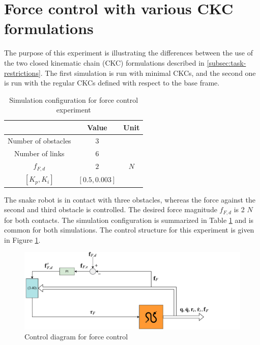 \section{Force control with various CKC formulations}\label{sec:2xminiJforce}

The purpose of this experiment is illustrating the differences between the use of the two closed kinematic chain (CKC) formulations described in \ref{subsec:task-restrictions}. The first simulation is run with minimal CKCs, and the second one is run with the regular CKCs defined with respect to the base frame.

\begin{table}[h!]
    \centering
    \begin{tabular}{|c|c|c|}
        \hline
        & \textbf{Value} & \textbf{Unit}\\
        \hline \hline
        Number of obstacles & $3$ & \\
        Number of links & $6$ & \\
        $f_{F,d}$ & $2$ & $N$ \\
        $[K_{p}, K_{i}]$ & $[0.5, 0.003]$ &\\
        \hline
    \end{tabular}
    \caption{Simulation configuration for force control experiment}
    \label{tab:exp_2xf}
\end{table}

The snake robot is in contact with three obstacles, whereas the force against the second and third obstacle is controlled. The desired force magnitude $f_{F,d}$ is 2 $N$ for both contacts. The simulation configuration is summarized in Table \ref{tab:exp_2xf} and is common for both simulations. The control structure for this experiment is given in Figure \ref{fig:diag-f}.



\begin{figure}[h!]
    \centering
    \includegraphics[trim=0cm 0cm 3cm 0cm, clip=true, width=\textwidth]{figures/experiments/control-diagrams/2f-control-diagram.pdf}
    \caption{Control diagram for force control}
    \label{fig:diag-f}
\end{figure}

